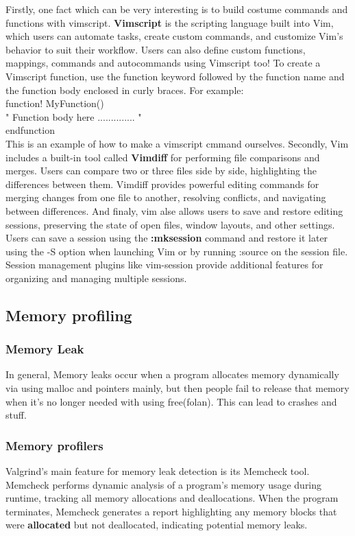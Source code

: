 \documentclass[12pt, letterpaper]{article}
\begin{document}
Firstly, one fact which can be very interesting is to build costume commands and functions with vimscript. \textbf{Vimscript} is the scripting language built into Vim, which users can automate tasks, create custom commands, and customize Vim's behavior to suit their workflow.
Users can also define custom functions, mappings, commands and autocommands using Vimscript too!
To create a Vimscript function, use the function keyword followed by the function name and the function body enclosed in curly braces. For example: \\
function! MyFunction() \\
  " Function body here .............. " \\ 
endfunction \\
This is an example of how to make a vimscript cmmand ourselves.
Secondly, Vim includes a built-in tool called \textbf{Vimdiff} for performing file comparisons and merges.
Users can compare two or three files side by side, highlighting the differences between them.
Vimdiff provides powerful editing commands for merging changes from one file to another, resolving conflicts, and navigating between differences.
And finaly, vim alse allows users to save and restore editing sessions, preserving the state of open files, window layouts, and other settings.
Users can save a session using the \textbf{:mksession} command and restore it later using the -S option when launching Vim or by running :source on the session file.
Session management plugins like vim-session provide additional features for organizing and managing multiple sessions.
\subsection{ Memory profiling}
\subsubsection{Memory Leak}
In general, Memory leaks occur when a program allocates memory dynamically via using malloc and pointers mainly, but then people fail to release that memory when it's no longer needed with using free(folan). This can lead to crashes and stuff.
\subsubsection{Memory profilers}
Valgrind's main feature for memory leak detection is its Memcheck tool. Memcheck performs dynamic analysis of a program's memory usage during runtime, tracking all memory allocations and deallocations.
When the program terminates, Memcheck generates a report highlighting any memory blocks that were \textbf{allocated} but not deallocated, indicating potential memory leaks.
\end{document}
